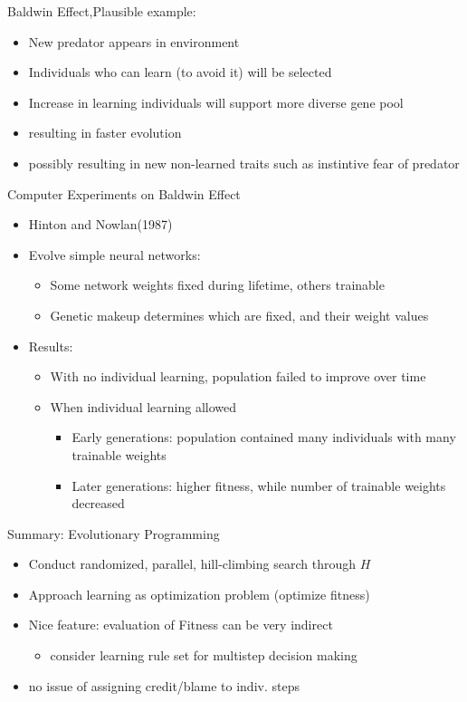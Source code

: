 \documentclass[presentation]{beamer}
\begin{document}
\begin{frame}[label={sec:org3b2823a}]{Baldwin Effect,Plausible example:}
\begin{itemize}
\item New predator appears in environment
\item Individuals who can learn (to avoid it) will be selected
\item Increase in learning individuals will support more diverse gene pool
\item resulting in faster evolution
\item possibly resulting in new non-learned traits such as instintive fear of predator
\end{itemize}
\end{frame}
\begin{frame}[label={sec:orgfdb91c5}]{Computer Experiments on Baldwin Effect}
\begin{itemize}
\item Hinton and Nowlan(1987)
\item Evolve simple neural networks:
\begin{itemize}
\item Some network weights fixed during lifetime, others trainable
\item Genetic makeup determines which are fixed, and their weight values
\end{itemize}
\item Results:
\begin{itemize}
\item With no individual learning, population failed to improve over time
\item When individual learning allowed
\begin{itemize}
\item Early generations: population contained many individuals with many trainable weights
\item Later generations: higher fitness, while number of trainable weights  decreased
\end{itemize}
\end{itemize}
\end{itemize}
\end{frame}
\begin{frame}[label={sec:org9ed3b3a}]{Summary: Evolutionary Programming}
\begin{itemize}
\item Conduct randomized, parallel, hill-climbing search through \(H\)
\item Approach learning as optimization problem (optimize fitness)
\item Nice feature: evaluation of Fitness can be very indirect
\begin{itemize}
\item consider learning rule set for multistep decision making
\end{itemize}
\item no issue of assigning credit/blame to indiv. steps
\end{itemize}
\end{frame}
\end{document}
